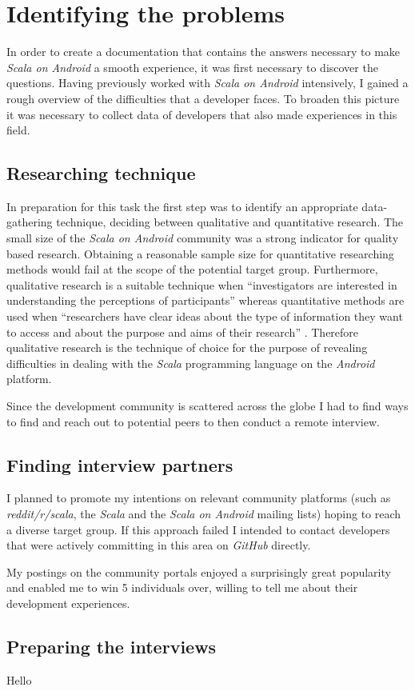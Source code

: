 \section{Identifying the problems}

In order to create a documentation that contains the answers necessary to make \textit{Scala on Android} a smooth experience, it was first necessary to discover the questions. Having previously worked with \textit{Scala on Android} intensively, I gained a rough overview of the difficulties that a developer faces. To broaden this picture it was necessary to collect data of developers that also made experiences in this field.

\subsection{Researching technique}

In preparation for this task the first step was to identify an appropriate data-gathering technique, deciding between qualitative and quantitative research. The small size of the \textit{Scala on Android} community was a strong indicator for quality based research. Obtaining a reasonable sample size for quantitative researching methods would fail at the scope of the potential target group. Furthermore, qualitative research is a suitable technique when \enquote{investigators are interested in understanding the perceptions of participants} \cite[p. 72]{berg01} whereas quantitative methods are used when \enquote{researchers have clear ideas about the type of information they want to access and about the purpose and aims of their research} \cite[p. 72]{berg01}. Therefore qualitative research is the technique of choice for the purpose of revealing difficulties in dealing with the \textit{Scala} programming language on the \textit{Android} platform.

Since the development community is scattered across the globe I had to find ways to find and reach out to potential peers to then conduct a remote interview.

\subsection{Finding interview partners}

I planned to promote my intentions on relevant community platforms (such as \textit{reddit/r/scala}, the \textit{Scala} and the \textit{Scala on Android} mailing lists) hoping to reach a diverse target group. If this approach failed I intended to contact developers that were actively committing in this area on \textit{GitHub} directly.

My postings on the community portals enjoyed a surprisingly great popularity and enabled me to win 5 individuals over, willing to tell me about their development experiences.

\subsection{Preparing the interviews}

Hello